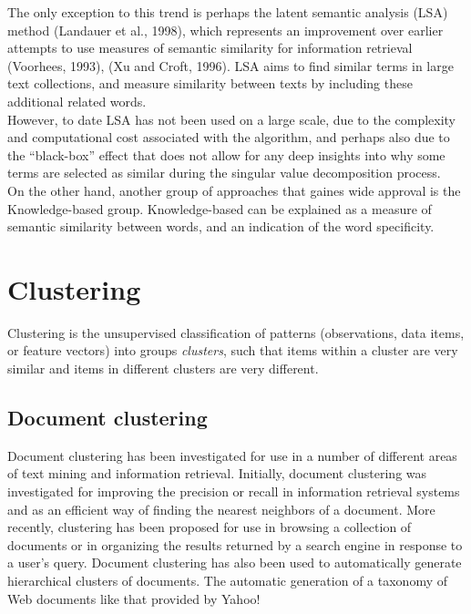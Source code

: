 The only exception to this trend is perhaps the latent semantic analysis (LSA) method (Landauer et al., 1998), which represents an improvement over earlier attempts to use measures of semantic similarity for information retrieval (Voorhees, 1993), (Xu and Croft, 1996). LSA aims to find similar terms in large text collections, and measure similarity between texts by including these additional related words. \\
However, to date LSA has not been used on a large scale, due to the complexity and computational cost associated with the algorithm, and perhaps also due to the “black-box” effect that does not allow for any deep insights into why some terms are selected as similar during the singular value decomposition process.\\

On the other hand, another group of approaches that gaines wide approval is the Knowledge-based group. Knowledge-based can be explained as a measure of semantic similarity between words, and an indication of the word specificity.\\

\section{Clustering}
Clustering is the unsupervised classification of patterns (observations, data items, or feature vectors) into groups \textit{clusters}, such that items within a cluster are very similar and items in different clusters are very different.

\subsection{Document clustering}
Document clustering has been investigated for use in a number of different areas of text
mining and information retrieval. Initially, document clustering was investigated for improving
the precision or recall in information retrieval systems and as an efficient way of
finding the nearest neighbors of a document. More recently, clustering has been
proposed for use in browsing a collection of documents or in organizing the results
returned by a search engine in response to a user’s query. Document clustering has
also been used to automatically generate hierarchical clusters of documents. The
automatic generation of a taxonomy of Web documents like that provided by Yahoo!

